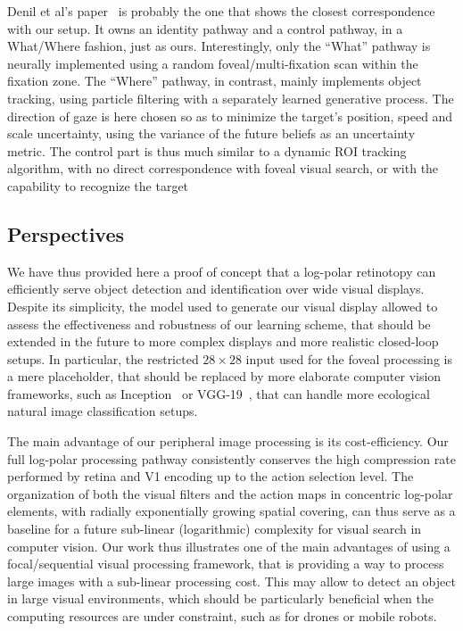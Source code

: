 Denil et al's paper~\cite{denil2012learning} is probably the one that shows the closest correspondence with our setup. It owns an identity pathway and a control pathway, in a What/Where fashion, just as ours. Interestingly, only the ``What'' pathway is neurally implemented using a random foveal/multi-fixation scan within the fixation zone. The ``Where'' pathway, in contrast, mainly implements object tracking, using particle filtering with a separately learned generative process. The direction of gaze is here chosen so as to minimize the target's position, speed and scale uncertainty, using the variance of the future beliefs as an uncertainty metric. The control part is thus much similar to a dynamic ROI tracking algorithm, with no direct correspondence with foveal visual search, or with the capability to recognize the target
%
\subsection{Perspectives}
%
We have thus provided here %
a proof of concept that a log-polar retinotopy can efficiently serve object detection and identification over wide visual displays. Despite its simplicity, the %
model used to generate our visual display allowed to assess the effectiveness and robustness of our learning scheme, that should be extended in the future to more complex displays and more realistic closed-loop setups. In particular, the restricted $28\times28$ input used for the foveal processing is a mere placeholder, that should be replaced by more elaborate computer vision frameworks, such as Inception~\cite{szegedy2015going} or VGG-19~\cite{simonyan2014very}, that can handle more ecological natural image classification setups.

The main advantage of our peripheral image processing is its cost-efficiency. Our full log-polar processing pathway consistently conserves the high compression rate performed by retina and V1 encoding up to the action selection level. The organization of both the visual filters and the action maps in concentric log-polar elements, with radially exponentially growing spatial covering, can thus serve as a baseline for a future sub-linear (logarithmic) complexity for visual search in computer vision. Our work thus illustrates one of the main advantages of using a focal/sequential visual processing framework, that is providing a way to process large images with a sub-linear processing cost. This may allow to detect an object in large visual environments, which should be particularly beneficial when the computing resources are under constraint, such as for drones or mobile robots.

